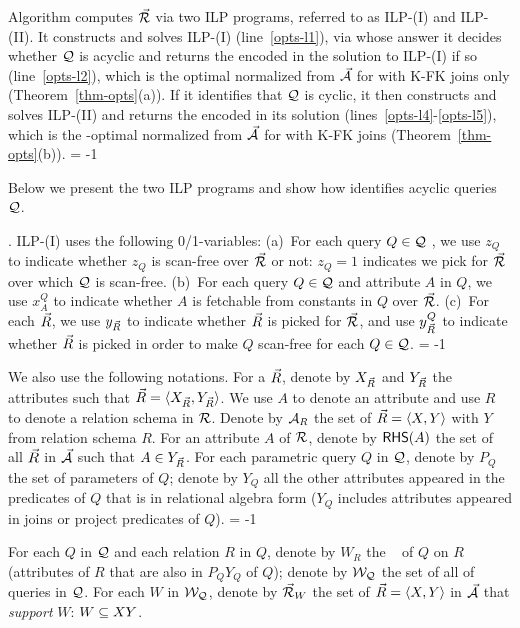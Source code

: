 {Algorithm \opts computes $\vec{{\mathcal R}}$ via two ILP programs,
referred to as ILP-(I) and ILP-(II).
It constructs and solves ILP-(I) (line~\ref{opts-l1}),
via whose answer it decides whether $\mathcal Q$ is acyclic and
returns the \bds encoded in the solution to ILP-(I) if so
(line~\ref{opts-l2}), which is the optimal normalized \bds from
$\vec{{\mathcal A}}$ for \SPC with K-FK joins only
(Theorem~\ref{thm-opts}(a)). 
If it identifies that $\mathcal Q$ is cyclic, it then constructs and
solves ILP-(II) and returns the \bds encoded in its solution
(lines~\ref{opts-l4}-\ref{opts-l5}), which is the \ssf-optimal
normalized \bds from $\vec{{\mathcal A}}$ for \SPC with K-FK joins
(Theorem~\ref{thm-opts}(b)).
\looseness = -1


\vspace{0.8ex}
Below we present the two ILP programs and show how \opts
identifies acyclic queries $\mathcal Q$. 


. 
ILP-(I) uses the following 0/1-variables: 
(a)~For each query $Q\in \mathcal Q$ , we use $z_{Q}$ to indicate whether
$z_{Q}$ is scan-free over $\vec{{\mathcal R}}$ or not:
$z_{Q} = 1$ indicates we pick \bss for $\vec{{\mathcal R}}$ over which $\mathcal Q$ is scan-free.
(b)~For each query $Q\in \mathcal Q$ and attribute $A$ in $Q$, we use
$x_{A}^{Q}$ to indicate whether $A$ is fetchable from constants
in $Q$ over $\vec{{\mathcal R}}$. 
(c)~For each \bs $\vec{R}$, we use $y_{\vec{R}}$ to indicate
whether $\vec{R}$ is picked for $\vec{{\mathcal R}}$, and use $y^{Q}_{\vec{R}}$ to
indicate whether $\vec{R}$ is picked in order to make $Q$ scan-free
for each $Q\in \mathcal Q$.
\looseness = -1

\vspace{0.4ex}
We also use the following notations. For a \bs $\vec{R}$,
denote by $X_{\vec{R}}$ and $Y_{\vec{R}}$ the attributes such that
$\vec{R}\allowbreak =\allowbreak  \langle X_{\vec{R}},\allowbreak Y_{\vec{R}}\rangle$.
We use $A$ to denote an attribute and use $R$ to denote a
relation schema in ${\mathcal R}$.
Denote by ${\mathcal A}_{R}$ the set of \bss $\vec{R} \allowbreak = \allowbreak
\langle X,\allowbreak Y\rangle$ with $Y$ from relation schema $R$. For an
attribute $A$ of ${\mathcal R}$, denote by ${\mathsf{RHS}}(A)$ the set of all \bss
$\vec{R}$ in $\vec{{\mathcal A}}$ such that $A\in Y_{\vec{R}}$.
%
For each parametric query $Q$ in $\mathcal Q$, denote by $P_{Q}$ the set
of parameters of $Q$; denote by $Y_{Q}$ all the other
attributes appeared in the predicates of $Q$ that is in relational
algebra form (\ie $Y_{Q}$ includes attributes appeared
in joins or project predicates of $Q$). 
\looseness = -1

For each $Q$ in $\mathcal Q$ and each relation $R$ in $Q$, denote by
$W_{R}$ the \qcs~\cite{blinkdb} of $Q$ on $R$ (\ie attributes of
$R$ that are also in $P_{Q}Y_{Q}$ of $Q$); denote by $\mathcal{W}_{\mathcal Q}$
the set of all \qcs of queries in $\mathcal Q$. For each \qcs $W$ in
$\mathcal{W}_{\mathcal Q}$, denote by $\vec{{\mathcal R}}_{W}$ the set of \bss $\vec{R}\allowbreak
=\allowbreak \langle X,\allowbreak Y\rangle$ in $\vec{{\mathcal A}}$ that {\em support} $W$: $W\allowbreak\subseteq\allowbreak XY$. 

}
